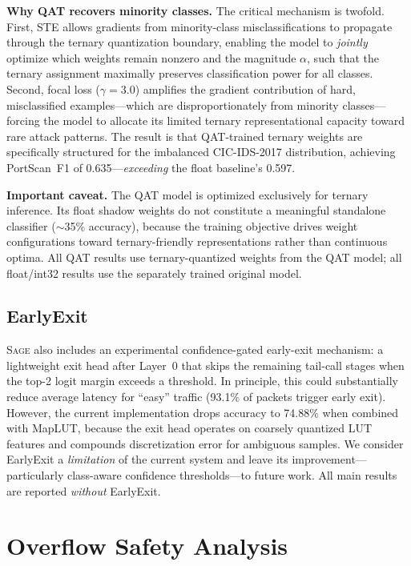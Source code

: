 \documentclass[sigconf,nonacm]{acmart}
\newcommand{\sys}{\textsc{Sage}\xspace}
\begin{document}
\textbf{Why QAT recovers minority classes.}
The critical mechanism is twofold.
First, STE allows gradients from minority-class misclassifications to
propagate through the ternary quantization boundary, enabling the model
to \emph{jointly} optimize which weights remain nonzero and the
magnitude $\alpha$, such that the ternary assignment maximally preserves
classification power for all classes.
Second, focal loss ($\gamma = 3.0$) amplifies the gradient contribution
of hard, misclassified examples---which are disproportionately from
minority classes---forcing the model to allocate its limited ternary
representational capacity toward rare attack patterns.
The result is that QAT-trained ternary weights are specifically
structured for the imbalanced CIC-IDS-2017 distribution, achieving
PortScan~F1 of 0.635---\emph{exceeding} the float baseline's 0.597.

\textbf{Important caveat.}
The QAT model is optimized exclusively for ternary inference.
Its float shadow weights do not constitute a meaningful standalone
classifier (${\sim}$35\% accuracy), because the training objective
drives weight configurations toward ternary-friendly representations
rather than continuous optima.
All QAT results use ternary-quantized weights from the QAT model; all
float/int32 results use the separately trained original model.

\subsection{EarlyExit}\label{sec:earlyexit}

\sys also includes an experimental confidence-gated early-exit
mechanism: a lightweight exit head after Layer~0 that skips the
remaining tail-call stages when the top-2 logit margin exceeds a
threshold.
In principle, this could substantially reduce average latency for
``easy'' traffic (93.1\% of packets trigger early exit).
However, the current implementation drops accuracy to 74.88\% when
combined with MapLUT, because the exit head operates on coarsely
quantized LUT features and compounds discretization error for ambiguous
samples.
We consider EarlyExit a \emph{limitation} of the current system and
leave its improvement---particularly class-aware confidence
thresholds---to future work.
All main results are reported \emph{without} EarlyExit.


\section{Overflow Safety Analysis}\label{sec:overflow}
\end{document}
